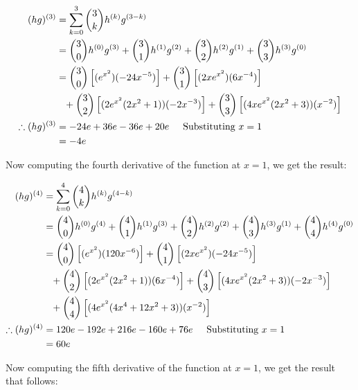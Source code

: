 \documentclass[a4paper]{article}
\begin{document}
\begin{enumerate}[label=\textbf{\arabic*.}]
\begin{enumerate}
		\begin{align*}
		(hg)^{(3)} & = \sum_{k = 0}^{3}
		\binom{3}{k} h^{(k)}g^{(3-k)}\\
		& = \binom{3}{0}h^{(0)}g^{(3)} + \binom{3}{1}h^{(1)}g^{(2)} + \binom{3}{2}h^{(2)}g^{(1)} + \binom{3}{3}h^{(3)}g^{(0)}\\
		& = \binom{3}{0}\left[(e^{x^2})(-24x^{-5})\right] + \binom{3}{1}\left[(2xe^{x^2})(6x^{-4})\right] \\
		& \phantom{{=}} + \binom{3}{2}\left[(2e^{x^2}(2x^2+1))(-2x^{-3})\right] + \binom{3}{3}\left[(4xe^{x^2}(2x^2+3))(x^{-2})\right]\\
		\therefore (hg)^{(3)} & = -24e + 36e - 36e + 20e \hspace{5mm} \text{Substituting } x = 1\\
		& = -4e\\
		\end{align*}

		\pagebreak

		Now computing the fourth derivative of the function at $x=1$, we get the result:

		\begin{align*}
		(hg)^{(4)} & = \sum_{k = 0}^{4}
		\binom{4}{k} h^{(k)}g^{(4-k)}\\
		& = \binom{4}{0}h^{(0)}g^{(4)} + \binom{4}{1}h^{(1)}g^{(3)} + \binom{4}{2}h^{(2)}g^{(2)} + \binom{4}{3}h^{(3)}g^{(1)} + \binom{4}{4}h^{(4)}g^{(0)}\\
		& = \binom{4}{0}\left[(e^{x^2})(120x^{-6})\right] + \binom{4}{1}\left[(2xe^{x^2})(-24x^{-5})\right] \\
		& \phantom{{=}} + \binom{4}{2}\left[(2e^{x^2}(2x^2+1))(6x^{-4})\right] + \binom{4}{3}\left[(4xe^{x^2}(2x^2+3))(-2x^{-3})\right]\\ 
		& \phantom{{=}} + \binom{4}{4}\left[(4e^{x^2}(4x^4+12x^2+3))(x^{-2})\right]\\
		\therefore (hg)^{(4)} & = 120e -192e + 216e - 160e + 76e \hspace{5mm} \text{Substituting } x = 1\\
		& = 60e\\
		\end{align*}

		Now computing the fifth derivative of the function at $x=1$, we get the result that follows:


\end{enumerate}
\end{enumerate}
\end{document}

